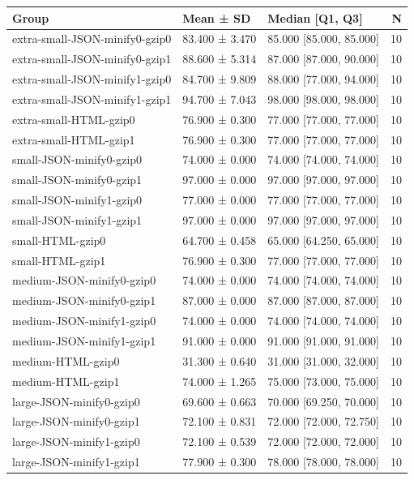 \begin{tabular}{lllr}
\toprule
Group & Mean ± SD & Median [Q1, Q3] & N \\
\midrule
extra-small-JSON-minify0-gzip0 & 83.400 ± 3.470 & 85.000 [85.000, 85.000] & 10 \\
extra-small-JSON-minify0-gzip1 & 88.600 ± 5.314 & 87.000 [87.000, 90.000] & 10 \\
extra-small-JSON-minify1-gzip0 & 84.700 ± 9.809 & 88.000 [77.000, 94.000] & 10 \\
extra-small-JSON-minify1-gzip1 & 94.700 ± 7.043 & 98.000 [98.000, 98.000] & 10 \\
extra-small-HTML-gzip0 & 76.900 ± 0.300 & 77.000 [77.000, 77.000] & 10 \\
extra-small-HTML-gzip1 & 76.900 ± 0.300 & 77.000 [77.000, 77.000] & 10 \\
small-JSON-minify0-gzip0 & 74.000 ± 0.000 & 74.000 [74.000, 74.000] & 10 \\
small-JSON-minify0-gzip1 & 97.000 ± 0.000 & 97.000 [97.000, 97.000] & 10 \\
small-JSON-minify1-gzip0 & 77.000 ± 0.000 & 77.000 [77.000, 77.000] & 10 \\
small-JSON-minify1-gzip1 & 97.000 ± 0.000 & 97.000 [97.000, 97.000] & 10 \\
small-HTML-gzip0 & 64.700 ± 0.458 & 65.000 [64.250, 65.000] & 10 \\
small-HTML-gzip1 & 76.900 ± 0.300 & 77.000 [77.000, 77.000] & 10 \\
medium-JSON-minify0-gzip0 & 74.000 ± 0.000 & 74.000 [74.000, 74.000] & 10 \\
medium-JSON-minify0-gzip1 & 87.000 ± 0.000 & 87.000 [87.000, 87.000] & 10 \\
medium-JSON-minify1-gzip0 & 74.000 ± 0.000 & 74.000 [74.000, 74.000] & 10 \\
medium-JSON-minify1-gzip1 & 91.000 ± 0.000 & 91.000 [91.000, 91.000] & 10 \\
medium-HTML-gzip0 & 31.300 ± 0.640 & 31.000 [31.000, 32.000] & 10 \\
medium-HTML-gzip1 & 74.000 ± 1.265 & 75.000 [73.000, 75.000] & 10 \\
large-JSON-minify0-gzip0 & 69.600 ± 0.663 & 70.000 [69.250, 70.000] & 10 \\
large-JSON-minify0-gzip1 & 72.100 ± 0.831 & 72.000 [72.000, 72.750] & 10 \\
large-JSON-minify1-gzip0 & 72.100 ± 0.539 & 72.000 [72.000, 72.000] & 10 \\
large-JSON-minify1-gzip1 & 77.900 ± 0.300 & 78.000 [78.000, 78.000] & 10 \\

\end{tabular}
